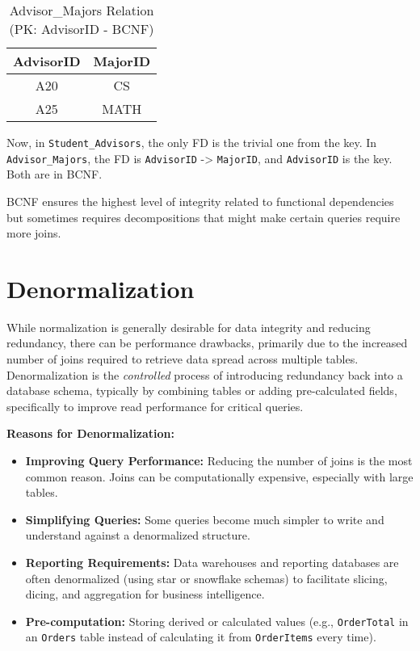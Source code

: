 \documentclass[12pt]{book}
\begin{document}
\begin{table}[htbp]
\centering
\begin{tabular}{@{}cc@{}}
\toprule
AdvisorID & MajorID \\ %
\midrule
 A20 & CS \\
 A25 & MATH \\
\bottomrule
\end{tabular}
\caption{Advisor\_Majors Relation (PK: AdvisorID - BCNF)}
\label{tab:advisor_majors_bcnf}
\end{table}

Now, in \texttt{Student\_Advisors}, the only FD is the trivial one from the key. In \texttt{Advisor\_Majors}, the FD is \texttt{AdvisorID} -> \texttt{MajorID}, and \texttt{AdvisorID} is the key. Both are in BCNF.

BCNF ensures the highest level of integrity related to functional dependencies but sometimes requires decompositions that might make certain queries require more joins.

\section{Denormalization}

While normalization is generally desirable for data integrity and reducing redundancy, there can be performance drawbacks, primarily due to the increased number of joins required to retrieve data spread across multiple tables. Denormalization is the \emph{controlled} process of introducing redundancy back into a database schema, typically by combining tables or adding pre-calculated fields, specifically to improve read performance for critical queries.

\textbf{Reasons for Denormalization:}
\begin{itemize}
    \item \textbf{Improving Query Performance:} Reducing the number of joins is the most common reason. Joins can be computationally expensive, especially with large tables.
    \item \textbf{Simplifying Queries:} Some queries become much simpler to write and understand against a denormalized structure.
    \item \textbf{Reporting Requirements:} Data warehouses and reporting databases are often denormalized (using star or snowflake schemas) to facilitate slicing, dicing, and aggregation for business intelligence.
    \item \textbf{Pre-computation:} Storing derived or calculated values (e.g., \texttt{OrderTotal} in an \texttt{Orders} table instead of calculating it from \texttt{OrderItems} every time).
\end{itemize}
\end{document}
